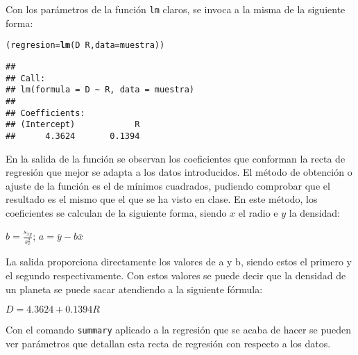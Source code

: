 \documentclass[12pt]{report}\usepackage[]{graphicx}\usepackage[dvipsnames]{xcolor}
\makeatletter
\newcommand{\hlopt}[1]{\textcolor[rgb]{0,0,0}{#1}}%
\newcommand{\hlstd}[1]{\textcolor[rgb]{0.345,0.345,0.345}{#1}}%
\newcommand{\hlkwb}[1]{\textcolor[rgb]{0.69,0.353,0.396}{#1}}%
\newcommand{\hlkwc}[1]{\textcolor[rgb]{0.333,0.667,0.333}{#1}}%
\newcommand{\hlkwd}[1]{\textcolor[rgb]{0.737,0.353,0.396}{\textbf{#1}}}%
\newenvironment{kframe}{%
 \def\at@end@of@kframe{}%
 \ifinner\ifhmode%
  \def\at@end@of@kframe{\end{minipage}}%
  \begin{minipage}{\columnwidth}%
 \fi\fi%
 \def\FrameCommand##1{\hskip\@totalleftmargin \hskip-\fboxsep
 \colorbox{shadecolor}{##1}\hskip-\fboxsep
     \hskip-\linewidth \hskip-\@totalleftmargin \hskip\columnwidth}%
 \MakeFramed {\advance\hsize-\width
   \@totalleftmargin\z@ \linewidth\hsize
   \@setminipage}}%
 {\par\unskip\endMakeFramed%
 \at@end@of@kframe}
\newenvironment{knitrout}{}{} %
\makeatother
\begin{document}
	Con los parámetros de la función \texttt{lm} claros, se invoca a la misma de la siguiente forma:
	
\begin{knitrout}
\color{fgcolor}\begin{kframe}
\begin{alltt}
\hlstd{(regresion}\hlkwb{=}\hlkwd{lm}\hlstd{(D}\hlopt{~}\hlstd{R,} \hlkwc{data}\hlstd{=muestra))}
\end{alltt}
\begin{verbatim}
## 
## Call:
## lm(formula = D ~ R, data = muestra)
## 
## Coefficients:
## (Intercept)            R  
##      4.3624       0.1394
\end{verbatim}
\end{kframe}
\end{knitrout}
	
	En la salida de la función se observan los coeficientes que conforman la recta de regresión que mejor se adapta a los datos introducidos. El método de obtención o ajuste de la función es el de mínimos cuadrados, pudiendo comprobar que el resultado es el mismo que el que se ha visto en clase. En este método, los coeficientes se calculan de la siguiente forma, siendo $x$ el radio e $y$ la densidad:
	
	\begin{center}
		$b = \frac{s_{xy}}{s^{2}_x}$;
		$a = \overline{y} -b\overline{x}$
	\end{center}
	 
	 La salida proporciona directamente los valores de a y b, siendo estos el primero y el segundo respectivamente. Con estos valores se puede decir que la densidad de un planeta se puede sacar atendiendo a la siguiente fórmula:
	 
	 \begin{center}
	 	$D = 4.3624 + 0.1394R$
	 \end{center}
	 
	 Con el comando \texttt{summary} aplicado a la regresión que se acaba de hacer se pueden ver parámetros que detallan esta recta de regresión con respecto a los datos.
	 
\end{document}

